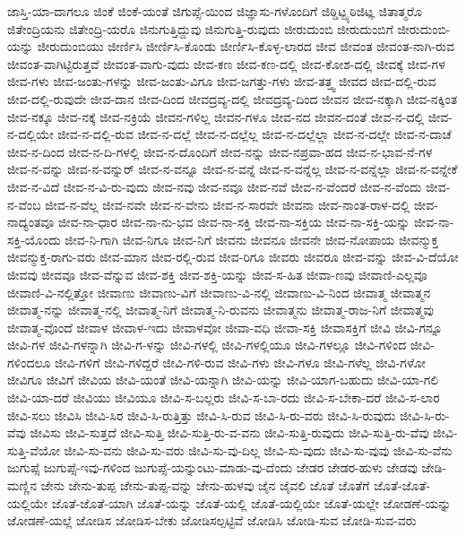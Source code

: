{ಜಾಸ್ತಿ-ಯಾ-ದಾಗಲೂ
ಜಿಂಕೆ
ಜಿಂಕೆ-ಯಂತೆ
ಜಿಗುಪ್ಸೆ-ಯಿಂದ
ಜಿಜ್ಞಾಸು-ಗಳೊಂದಿಗೆ
ಜಿಠ್ಡಿಟ್ಝ್ಠಠಿಜಿಟ್ಞ
ಜಿತಾತ್ಮರೊ
ಜಿತೇಂದ್ರಿಯನು
ಜಿತೇಂದ್ರಿ-ಯರೊ
ಜಿನುಗುತ್ತಿದ್ದುವು
ಜಿನುಗುತ್ತಿ-ರುವುದು
ಜೀರುದುಂಬಿ
ಜೀರುದುಂಬಿಗೆ
ಜೀರುದುಂಬಿ-ಯನ್ನು
ಜೀರುದುಂಬಿಯು
ಜೀರ್ಣಿಸಿ
ಜೀರ್ಣಿಸಿ-ಕೊಂಡು
ಜೀರ್ಣಿಸಿ-ಕೊಳ್ಳ-ಲಾರದ
ಜೀವ
ಜೀವಂತ
ಜೀವಂತ-ನಾಗಿ-ರುವ
ಜೀವಂತ-ವಾಗಿಟ್ಟಿರುತ್ತವೆ
ಜೀವಂತ-ವಾಗು-ವುದು
ಜೀವ-ಕಣ
ಜೀವ-ಕಣ-ದಲ್ಲಿ
ಜೀವ-ಕೋಶ-ದಲ್ಲಿ
ಜೀವಕ್ಕೆ
ಜೀವ-ಗಳ
ಜೀವ-ಗಳು
ಜೀವ-ಜಂತು-ಗಳನ್ನು
ಜೀವ-ಜಂತು-ವಿಗೂ
ಜೀವ-ಜಗತ್ತು-ಗಳು
ಜೀವ-ತತ್ತ್ವ
ಜೀವದ
ಜೀವ-ದಲ್ಲಿ-ರುವ
ಜೀವ-ದಲ್ಲಿ-ರುವುದೇ
ಜೀವ-ದಾನ
ಜೀವ-ದಿಂದ
ಜೀವದ್ರವ್ಯ-ದಲ್ಲಿ
ಜೀವದ್ರವ್ಯ-ದಿಂದ
ಜೀವನ
ಜೀವ-ನಕ್ಕಾಗಿ
ಜೀವ-ನಕ್ಕಿಂತ
ಜೀವ-ನಕ್ಕೂ
ಜೀವ-ನಕ್ಕೆ
ಜೀವ-ನಕ್ರಿಯೆ
ಜೀವನ-ಗಳಿಲ್ಲ
ಜೀವನ-ಗಳೂ
ಜೀವ-ನದ
ಜೀವನ-ದಂತೆ
ಜೀವ-ನ-ದಲ್ಲಿ
ಜೀವ-ನ-ದಲ್ಲಿಯೇ
ಜೀವ-ನ-ದಲ್ಲಿ-ರುವ
ಜೀವ-ನ-ದಲ್ಲೆ
ಜೀವ-ನ-ದಲ್ಲೆಲ್ಲ
ಜೀವ-ನ-ದಲ್ಲೆಲ್ಲಾ
ಜೀವ-ನ-ದಲ್ಲೇ
ಜೀವ-ನ-ದಾಚೆ
ಜೀವ-ನ-ದಿಂದ
ಜೀವ-ನ-ದಿ-ಗಳಲ್ಲಿ
ಜೀವ-ನ-ದೊಂದಿಗೆ
ಜೀವ-ನನ್ನು
ಜೀವ-ನಪ್ರವಾ-ಹದ
ಜೀವ-ನ-ಭಾವ-ನೆ-ಗಳ
ಜೀವ-ನ-ವನ್ನು
ಜೀವ-ನ-ವನ್ನುರ್
ಜೀವ-ನ-ವನ್ನೂ
ಜೀವ-ನ-ವನ್ನೆ
ಜೀವ-ನ-ವನ್ನೆಲ್ಲ
ಜೀವ-ನ-ವನ್ನೆಲ್ಲಾ
ಜೀವ-ನ-ವನ್ನೇಕೆ
ಜೀವ-ನ-ವಿದೆ
ಜೀವ-ನ-ವಿ-ರು-ವುದು
ಜೀವ-ನವು
ಜೀವ-ನವೂ
ಜೀವ-ನವೆ
ಜೀವ-ನ-ವೆಂದರೆ
ಜೀವ-ನ-ವೆಂದು
ಜೀವ-ನ-ವೆಂಬ
ಜೀವ-ನ-ವೆಲ್ಲ
ಜೀವ-ನವೇ
ಜೀವ-ನ-ವೇನು
ಜೀವ-ನ-ಸಾರವೇ
ಜೀವನಾ
ಜೀವ-ನಾಂತ-ರಾಳ-ದಲ್ಲಿ
ಜೀವ-ನಾದ್ಯಂತವೂ
ಜೀವ-ನಾ-ಧಾರ
ಜೀವ-ನಾ-ನು-ಭವ
ಜೀವ-ನಾ-ಸಕ್ತಿ
ಜೀವ-ನಾ-ಸಕ್ತಿಯ
ಜೀವ-ನಾ-ಸಕ್ತಿ-ಯನ್ನು
ಜೀವ-ನಾ-ಸಕ್ತಿ-ಯೊಂದು
ಜೀವ-ನಿ-ಗಾಗಿ
ಜೀವ-ನಿಗೂ
ಜೀವ-ನಿಗೆ
ಜೀವನು
ಜೀವನೂ
ಜೀವನೇ
ಜೀವ-ನೋಪಾಯ
ಜೀವನ್ಮುಕ್ತ
ಜೀವನ್ಮುಕ್ತ-ರಾಗು-ವರು
ಜೀವ-ಮಾನ
ಜೀವ-ರಲ್ಲಿ-ರುವ
ಜೀವ-ರಿಗೂ
ಜೀವರು
ಜೀವರೂ
ಜೀವ-ವನ್ನು
ಜೀವ-ವಿ-ದೆಯೋ
ಜೀವವು
ಜೀವವೂ
ಜೀವ-ವೆನ್ನುವ
ಜೀವ-ಶಕ್ತಿ
ಜೀವ-ಶಕ್ತಿ-ಯನ್ನು
ಜೀವ-ಸ-ಹಿತ
ಜೀವಾ-ಣವು
ಜೀವಾಣಿ-ಎಲ್ಲವೂ
ಜೀವಾಣಿ-ವಿ-ನಲ್ಲಿತ್ತೋ
ಜೀವಾಣು
ಜೀವಾಣು-ವಿಗೆ
ಜೀವಾಣು-ವಿ-ನಲ್ಲಿ
ಜೀವಾಣು-ವಿ-ನಿಂದ
ಜೀವಾತ್ಮ
ಜೀವಾತ್ಮನ
ಜೀವಾತ್ಮ-ನನ್ನು
ಜೀವಾತ್ಮ-ನಲ್ಲಿ
ಜೀವಾತ್ಮ-ನಿಗೆ
ಜೀವಾತ್ಮ-ನಿ-ರುವನು
ಜೀವಾತ್ಮನು
ಜೀವಾತ್ಮ-ರಾಜ-ನಿಗೆ
ಜೀವಾತ್ಮವು
ಜೀವಾತ್ಮ-ವೊಂದೆ
ಜೀವಾಳ
ಜೀವಾಳ-ಇದು
ಜೀವಾಳವೋ
ಜೀವಾ-ವಧಿ
ಜೀವಾ-ಸಕ್ತಿ
ಜೀವಾಸಕ್ತಿಗೆ
ಜೀವಿ
ಜೀವಿ-ಗನ್ನೂ
ಜೀವಿ-ಗಳ
ಜೀವಿ-ಗಳನ್ನಾಗಿ
ಜೀವಿ-ಗ-ಳನ್ನು
ಜೀವಿ-ಗಳಲ್ಲಿ
ಜೀವಿ-ಗಳಲ್ಲಿಯೂ
ಜೀವಿ-ಗಳಲ್ಲೂ
ಜೀವಿ-ಗಳಿಂದ
ಜೀವಿ-ಗಳಿಂದಲೂ
ಜೀವಿ-ಗಳಿಗೆ
ಜೀವಿ-ಗಳಿದ್ದರೆ
ಜೀವಿ-ಗಳಿ-ರುವ
ಜೀವಿ-ಗಳು
ಜೀವಿ-ಗಳೂ
ಜೀವಿ-ಗಳೆಲ್ಲ
ಜೀವಿ-ಗಳೋ
ಜೀವಿಗೂ
ಜೀವಿಗೆ
ಜೀವಿಯ
ಜೀವಿ-ಯಂತೆ
ಜೀವಿ-ಯನ್ನಾಗಿ
ಜೀವಿ-ಯನ್ನು
ಜೀವಿ-ಯಾಗ-ಬಹುದು
ಜೀವಿ-ಯಾ-ಗಲಿ
ಜೀವಿ-ಯಾ-ದರೆ
ಜೀವಿಯು
ಜೀವಿಯೂ
ಜೀವಿ-ಸ-ಬಲ್ಲರು
ಜೀವಿ-ಸ-ಬಾ-ರದು
ಜೀವಿ-ಸ-ಬೇಕಾ-ದರೆ
ಜೀವಿ-ಸ-ಲಾರ
ಜೀವಿ-ಸಲು
ಜೀವಿಸಿ
ಜೀವಿ-ಸಿರ
ಜೀವಿ-ಸಿ-ರುತ್ತಿತ್ತು
ಜೀವಿ-ಸಿ-ರುವ
ಜೀವಿ-ಸಿ-ರು-ವರು
ಜೀವಿ-ಸಿ-ರುವುದು
ಜೀವಿ-ಸಿ-ರು-ವೆವು
ಜೀವಿಸು
ಜೀವಿ-ಸುತ್ತದೆ
ಜೀವಿ-ಸುತ್ತಿ
ಜೀವಿ-ಸುತ್ತಿ-ರು-ವ-ವನು
ಜೀವಿ-ಸುತ್ತಿ-ರುವುದು
ಜೀವಿ-ಸುತ್ತಿ-ರು-ವೆವು
ಜೀವಿ-ಸುತ್ತಿ-ವೆಯೋ
ಜೀವಿ-ಸು-ವನು
ಜೀವಿ-ಸು-ವರು
ಜೀವಿ-ಸು-ವು-ದಿಲ್ಲ
ಜೀವಿ-ಸು-ವುದು
ಜೀವಿ-ಸು-ವುವು
ಜೀವಿ-ಸು-ವೆನು
ಜುಗುಪ್ಸೆ
ಜುಗುಪ್ಸೆ-ಇವು-ಗಳಿಂದ
ಜುಗುಪ್ಸೆ-ಯನ್ನುಂಟು-ಮಾಡು-ವು-ದೆಂದು
ಜೇಡರ
ಜೇಡರ-ಹುಳು
ಜೇಡವು
ಜೇಡಿ-ಮಣ್ಣಿನ
ಜೇನು
ಜೇನು-ತುಪ್ಪ
ಜೇನು-ತುಪ್ಪ-ವನ್ನು
ಜೇನು-ಹುಳವು
ಜೈನ
ಜೈವಲಿ
ಜೊತೆ
ಜೊತೆಗೆ
ಜೊತೆ-ಜೊತೆ-ಯಲ್ಲಿಯೇ
ಜೊತೆ-ಜೊತೆ-ಯಾಗಿ
ಜೊತೆ-ಯನ್ನು
ಜೊತೆ-ಯಲ್ಲಿ
ಜೊತೆ-ಯಲ್ಲಿಯೇ
ಜೊತೆ-ಯಲ್ಲೇ
ಜೋಡಣೆ-ಯನ್ನು
ಜೋಡಣೆ-ಯಲ್ಲೆ
ಜೋಡಿಸ
ಜೋಡಿಸ-ಬೇಕು
ಜೋಡಿಸಲ್ಪಟ್ಟಿವೆ
ಜೋಡಿಸಿ
ಜೋಡಿ-ಸುವ
ಜೋಡಿ-ಸುವ-ವರು
}
